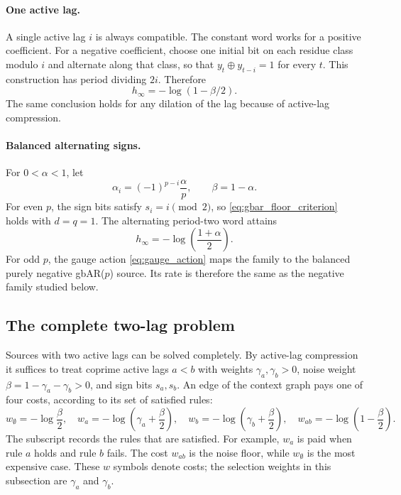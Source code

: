 \documentclass[11pt,a4paper]{article}
\begin{document}
\paragraph{One active lag.}
A single active lag $i$ is always compatible.  The constant word works
for a positive coefficient.  For a negative coefficient, choose one
initial bit on each residue class modulo $i$ and alternate along that
class, so that $y_t\oplus y_{t-i}=1$ for every $t$.  This construction
has period dividing $2i$.  Therefore
\begin{equation}
\label{eq:single_lag}
    h_\infty=-\log(1-\beta/2).
\end{equation}
The same conclusion holds for any dilation of the lag because of
active-lag compression.

\paragraph{Balanced alternating signs.}
For $0<\alpha<1$, let
\begin{equation}
\label{eq:alternating_sign_definition}
    \alpha_i=(-1)^{p-i}\frac{\alpha}{p},
    \qquad \beta=1-\alpha.
\end{equation}
For even $p$, the sign bits satisfy $s_i=i\pmod2$, so
\eqref{eq:gbar_floor_criterion} holds with $d=q=1$.  The alternating
period-two word attains
\begin{equation}
\label{eq:even_alternating}
    h_\infty=-\log\left(\frac{1+\alpha}{2}\right).
\end{equation}
For odd $p$, the gauge action \eqref{eq:gauge_action} maps the family to
the balanced purely negative gbAR($p$) source.  Its rate is therefore
the same as the negative family studied below.

\subsection{The complete two-lag problem}
\label{subsec:two_lag}

Sources with two active lags can be solved completely.  By active-lag
compression it suffices to treat coprime active lags $a<b$ with
weights $\gamma_a,\gamma_b>0$, noise weight
$\beta=1-\gamma_a-\gamma_b>0$, and sign bits $s_a,s_b$.  An edge of the
context graph pays one of four costs, according to its set of
satisfied rules:
\[
    w_\emptyset=-\log\frac{\beta}{2},\quad
    w_a=-\log\left(\gamma_a+\frac{\beta}{2}\right),\quad
    w_b=-\log\left(\gamma_b+\frac{\beta}{2}\right),\quad
    w_{ab}=-\log\left(1-\frac{\beta}{2}\right).
\]
The subscript records the rules that are satisfied.  For example,
$w_a$ is paid when rule $a$ holds and rule $b$ fails.  The cost
$w_{ab}$ is the noise floor, while $w_\emptyset$ is the most expensive
case.  These $w$ symbols denote costs; the selection weights in
this subsection are $\gamma_a$ and $\gamma_b$.
\end{document}
